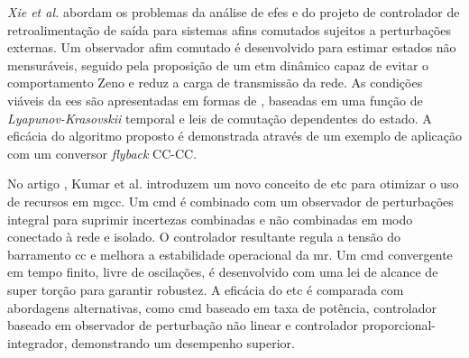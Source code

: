 \textit{Xie et al.} \cite{Xie2023} abordam os problemas da análise de \acrshort{efes} e do projeto de controlador de retroalimentação de saída para sistemas afins comutados sujeitos a perturbações externas. Um observador afim comutado é desenvolvido para estimar estados não mensuráveis, seguido pela proposição de um \acrshort{etm} dinâmico capaz de evitar o comportamento Zeno e reduz a carga de transmissão da rede. As condições viáveis da \acrshort{ees} são apresentadas em formas de , baseadas em uma função de \textit{Lyapunov-Krasovskii} temporal e leis de comutação dependentes do estado. A eficácia do algoritmo proposto é demonstrada através de um exemplo de aplicação com um conversor \textit{flyback} CC-CC.

No artigo \cite{Kumar2020}, Kumar et al. introduzem um novo conceito de \acrshort{etc} para otimizar o uso de recursos em \acrshort{mgcc}. Um \acrfull{cmd} é combinado com um observador de perturbações integral para suprimir incertezas combinadas e não combinadas em modo conectado à rede e isolado. O controlador resultante regula a tensão do barramento \acrshort{cc} e melhora a estabilidade operacional da \acrshort{mr}. Um \acrshort{cmd} convergente em tempo finito, livre de oscilações, é desenvolvido com uma lei de alcance de super torção para garantir robustez. A eficácia do \acrshort{etc} é comparada com abordagens alternativas, como \acrshort{cmd} baseado em taxa de potência, controlador baseado em observador de perturbação não linear e controlador proporcional-integrador, demonstrando um desempenho superior.


